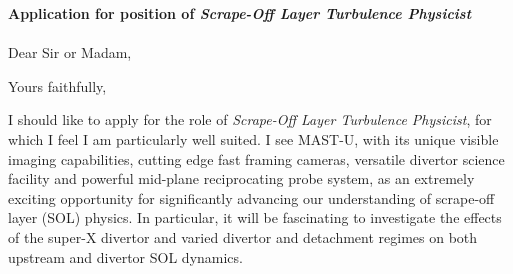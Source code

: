 \documentclass[11pt,a4paper,sans]{moderncv}        %
\begin{document}
%  

\clearpage
\date{\today}
\opening{\textbf{Application for position of \textit{Scrape-Off Layer Turbulence Physicist}}\\~\\
Dear Sir or Madam,}
\closing{Yours faithfully,}
\makelettertitle

I should like to apply for the role of \textit{Scrape-Off Layer Turbulence Physicist}, for which I feel I am particularly well suited.
I see MAST-U, with its unique visible imaging capabilities, cutting edge fast framing cameras, versatile divertor science facility and powerful mid-plane reciprocating probe system, as an extremely exciting opportunity for significantly advancing our understanding of scrape-off layer (SOL) physics.
In particular, it will be fascinating to investigate the effects of the super-X divertor and varied divertor and detachment regimes on both upstream and divertor SOL dynamics.
\end{document}
